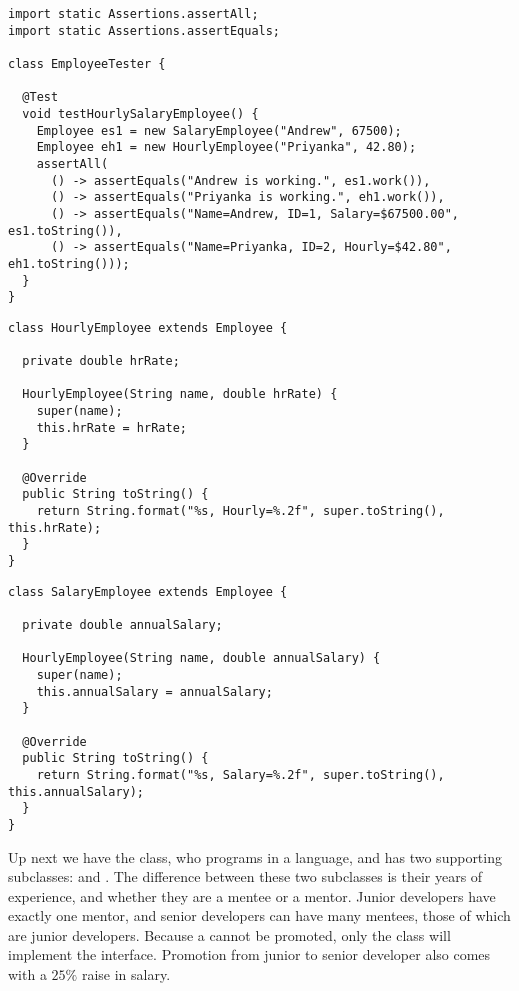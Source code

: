 \begin{lstlisting}[language=MyJava]
import static Assertions.assertAll;
import static Assertions.assertEquals;

class EmployeeTester {

  @Test
  void testHourlySalaryEmployee() {
    Employee es1 = new SalaryEmployee("Andrew", 67500);
    Employee eh1 = new HourlyEmployee("Priyanka", 42.80);
    assertAll(
      () -> assertEquals("Andrew is working.", es1.work()),
      () -> assertEquals("Priyanka is working.", eh1.work()),
      () -> assertEquals("Name=Andrew, ID=1, Salary=$67500.00", es1.toString()),
      () -> assertEquals("Name=Priyanka, ID=2, Hourly=$42.80", eh1.toString()));
  }
}
\end{lstlisting}

\begin{lstlisting}[language=MyJava]
class HourlyEmployee extends Employee {

  private double hrRate;

  HourlyEmployee(String name, double hrRate) {
    super(name);
    this.hrRate = hrRate;
  }

  @Override
  public String toString() {
    return String.format("%s, Hourly=%.2f", super.toString(), this.hrRate);
  }
}
\end{lstlisting}

\begin{lstlisting}[language=MyJava]
class SalaryEmployee extends Employee {

  private double annualSalary;

  HourlyEmployee(String name, double annualSalary) {
    super(name);
    this.annualSalary = annualSalary;
  }

  @Override
  public String toString() {
    return String.format("%s, Salary=%.2f", super.toString(), this.annualSalary);
  }
}
\end{lstlisting}

Up next we have the  class, who programs in a language, and has two supporting subclasses:  and . The difference between these two subclasses is their years of experience, and whether they are a mentee or a mentor. Junior developers have exactly one mentor, and senior developers can have many mentees, those of which are junior developers. Because a  cannot be promoted, only the  class will implement the  interface. Promotion from junior to senior developer also comes with a $25\%$ raise in salary.

